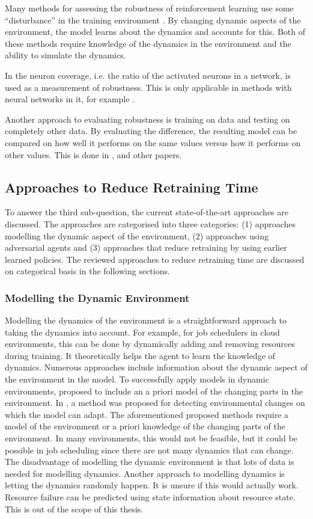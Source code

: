 Many methods for assessing the robustness of reinforcement learning use some
``disturbance'' in the training environment \cite{morimoto2005}. By
changing dynamic aspects of the environment, the model learns about the
dynamics and accounts for this. Both of these methods require knowledge of the
dynamics in the environment and the ability to simulate the dynamics.

In  the neuron coverage, i.e. the ratio of the activated
neurons in a network, is used as a measurement of robustness. This is only
applicable in \rl methods with neural networks in it, for example \dqn.

Another approach to evaluating robustness is training on data and
testing on completely other data. By evaluating the difference, the resulting
model can be compared on how well it performs on the same values versus how it
performs on other values. This is done in , and other papers.


\subsection{Approaches to Reduce Retraining Time}\label{sec:reduce}

To answer the third sub-question, the current state-of-the-art approaches are
discussed. The approaches are categorised into three categories: (1) approaches
modelling the dynamic aspect of the environment, (2) approaches using
adversarial agents and (3) approaches that reduce retraining by using earlier
learned policies. The reviewed approaches to reduce retraining time are
discussed on categorical basis in the following sections.


\subsubsection{Modelling the Dynamic Environment}\label{sec:model}

Modelling the dynamics of the environment is a straightforward approach to
taking the dynamics into account. For example, for job schedulers in cloud
environments, this can be done by dynamically adding and removing resources
during training. It theoretically helps the agent to learn the knowledge of
dynamics. Numerous approaches include information about the dynamic aspect of
the environment in the model. To successfully apply \rl models in dynamic
environments,  proposed to include an a priori model of the
changing parts in the environment. In , a method was
proposed for detecting environmental changes on which the model can adapt. The
aforementioned proposed methods require a model of the environment or a priori
knowledge of the changing parts of the environment. In many environments, this
would not be feasible, but it could be possible in job scheduling since there
are not many dynamics that can change. The disadvantage of modelling the
dynamic environment is that lots of data is needed for modelling dynamics.
Another approach to modelling dynamics is letting the dynamics randomly
happen. It is unsure if this would actually work. Resource failure can be
predicted using state information about resource state. This is out of the
scope of this thesis.


